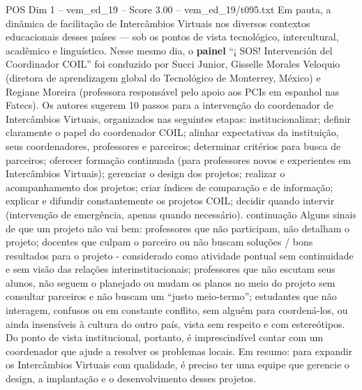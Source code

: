 \begin{textsample}{POS Dim 1 – vem\_ed\_19 – Score 3.00 – vem\_ed\_19/t095.txt}
Em pauta, a dinâmica de facilitação de Intercâmbios Virtuais nos diversos contextos educacionais desses países — sob os pontos de vista tecnológico, intercultural, acadêmico e linguístico.
Nesse mesmo dia, o \textbf{painel} “¡ SOS!
Intervención del Coordinador COIL” foi conduzido por Succi Junior, Gisselle Morales Veloquio (diretora de aprendizagem global do Tecnológico de Monterrey, México) e Regiane Moreira (professora responsável pelo apoio aos PCIs em espanhol nas Fatecs).
Os autores sugerem 10 passos para a intervenção do coordenador de Intercâmbios Virtuais, organizados nas seguintes etapas: institucionalizar; definir claramente o papel do coordenador COIL; alinhar expectativas da instituição, seus coordenadores, professores e parceiros; determinar critérios para busca de parceiros; oferecer formação continuada (para professores novos e experientes em Intercâmbios Virtuais); gerenciar o design dos projetos; realizar o acompanhamento dos projetos; criar índices de comparação e de informação; explicar e difundir constantemente os projetos COIL; decidir quando intervir (intervenção de emergência, apenas quando necessário). continuação Alguns sinais de que um projeto não vai bem: professores que não participam, não detalham o projeto; docentes que culpam o parceiro ou não buscam soluções / bons resultados para o projeto - considerado como atividade pontual sem continuidade e sem visão das relações interinstitucionais; professores que não escutam seus alunos, não seguem o planejado ou mudam os planos no meio do projeto sem consultar parceiros e não buscam um “justo meio-termo”; estudantes que não interagem, confusos ou em constante conflito, sem alguém para coordená-los, ou ainda insensíveis à cultura do outro país, vista sem respeito e com estereótipos.
Do ponto de vista institucional, portanto, é imprescindível contar com um coordenador que ajude a resolver os problemas locais.
Em resumo: para expandir os Intercâmbios Virtuais com qualidade, é preciso ter uma equipe que gerencie o design, a implantação e o desenvolvimento desses projetos.

\end{textsample}
